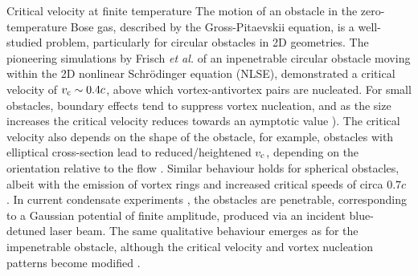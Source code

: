 \begin{chapter}{\label{cha:nonequib}Critical velocity at finite temperature}
The motion of an obstacle in the zero-temperature Bose gas, described by the Gross-Pitaevskii equation, is a well-studied problem, particularly for circular obstacles in 2D geometries.  The pioneering simulations by Frisch {\it et al.} \cite{frisch92} of an inpenetrable circular obstacle moving within the 2D nonlinear Schr\"odinger equation (NLSE), demonstrated a critical velocity of $v_{\rm c}\sim 0.4c$, above which vortex-antivortex pairs are nucleated.  For small obstacles, boundary effects tend to suppress vortex nucleation, and as the size increases the critical velocity reduces towards an aymptotic value \cite{berloff2000,rica2001,pham2004}).  The critical velocity also depends on the shape of the obstacle, for example, obstacles with elliptical cross-section lead to reduced/heightened $v_{\rm c}$, depending on the orientation relative to the flow \cite{stagg_parker_14, stagg_2015b}. Similar behaviour holds for spherical obstacles, albeit with the emission of vortex rings and increased critical speeds of circa $0.7 c$ \cite{winiecki_2000,win01,stagg_parker_14}. 
In current condensate experiments \cite{Neely,kwon_moon_14,Raman,Onofrio,Inouye,desbuquois_2012, kwon_2015a,kwon_2015b}, the obstacles are penetrable, corresponding to a Gaussian potential of finite amplitude, produced via an incident blue-detuned laser beam.  The same qualitative behaviour emerges as for the impenetrable obstacle, although the critical velocity and vortex nucleation patterns become modified \cite{saito10}. 


\end{chapter}
